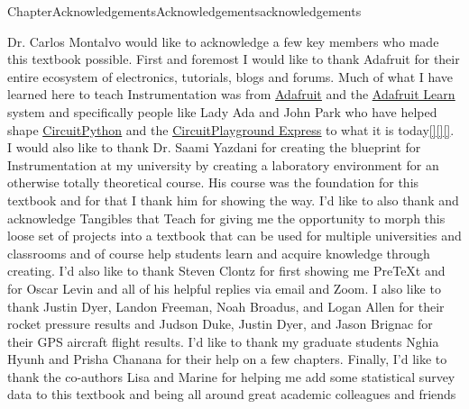 \documentclass[oneside,10pt,]{book}
\newcommand{\xreffont}{\relax}
\newcommand{\linkhilite}[1]{\underline{#1}}
\numberwithin{equation}{section}
\providecommand\phantomsection{}
\begin{document}
\begin{chapterptx}{Chapter}{Acknowledgements}{}{Acknowledgements}{}{}{acknowledgements}
\renewcommand*{\chaptername}{Chapter}
\begin{introduction}{}%
Dr. Carlos Montalvo would like to acknowledge a few key members who made this textbook possible. First and foremost I would like to thank Adafruit for their entire ecosystem of electronics, tutorials, blogs and forums. Much of what I have learned here to teach Instrumentation was from \href{https://www.adafruit.com/}{\linkhilite{Adafruit}} and the \href{https://learn.adafruit.com/}{\linkhilite{Adafruit Learn}} system and specifically people like Lady Ada and John Park who have helped shape \href{https://circuitpython.org/}{\linkhilite{CircuitPython}} and the \href{https://www.adafruit.com/product/3333}{\linkhilite{CircuitPlayground Express}} to what it is today\hyperlink{Adafruit}{\linkhilite{[{\xreffont 32}]}}\hyperlink{AdafruitMAIN}{\linkhilite{[{\xreffont 34}]}}\hyperlink{CircuitPython}{\linkhilite{[{\xreffont 30}]}}. I would also like to thank Dr. Saami Yazdani for creating the blueprint for Instrumentation at my university by creating a laboratory environment for an otherwise totally theoretical course. His course was the foundation for this textbook and for that I thank him for showing the way. I’d like to also thank and acknowledge Tangibles that Teach for giving me the opportunity to morph this loose set of projects into a textbook that can be used for multiple universities and classrooms and of course help students learn and acquire knowledge through creating. I'd also like to thank Steven Clontz for first showing me PreTeXt and for Oscar Levin and all of his helpful replies via email and Zoom. I also like to thank Justin Dyer, Landon Freeman, Noah Broadus, and Logan Allen for their rocket pressure results and Judson Duke, Justin Dyer, and Jason Brignac for their GPS aircraft flight results. I'd like to thank my graduate students Nghia Hyunh and Prisha Chanana for their help on a few chapters. Finally, I'd like to thank the co-authors Lisa and Marine for helping me add some statistical survey data to this textbook and being all around great academic colleagues and friends%
\end{introduction}%
\end{chapterptx}
%
\backmatter%
%
\clearpage\phantomsection%
%
%
%
\typeout{************************************************}
\typeout{************************************************}
\end{document}
